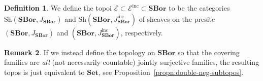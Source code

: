 \documentclass[11pt]{amsart}
\newcommand\br[1]{\langle{}#1\rangle{}}
\newcommand\cE{\mathcal{E}}
\newcommand\inc{\mathrm{inc}}
\newcommand\SBor{\mathbf{SBor}}
\newcommand\Set{\mathbf{Set}}
\newcommand\set[2][]{#1\{{#2}#1\}}
\newcommand\Sh{\mathrm{Sh}}
\newcommand\wh[1]{\widehat{#1}}
\theoremstyle{definition}
\newtheorem{defn}{Definition}[section]
\newtheorem{rmk}[defn]{Remark}
\theoremstyle{remark}
\theoremstyle{plain}
\begin{document}


\begin{defn}
  We define the topoi $\cE \subset \cE^{\inc} \subset \wh{\SBor}$ to be the categories $\Sh(\SBor,J_\SBor)$ and $\Sh(\SBor,J_\SBor^\inc)$ of sheaves on the presite $(\SBor,J_\SBor)$ and $(\SBor,J_\SBor^\inc)$, respectively.
\end{defn}

\begin{rmk}
  If we instead define the topology on \( \SBor \) so that the covering families are \emph{all} (not necessarily countable) jointly surjective families, the resulting topos is just equivalent to \( \Set \), see Proposition~\ref{propn:double-neg-subtopos}.
\end{rmk}
\end{document}
